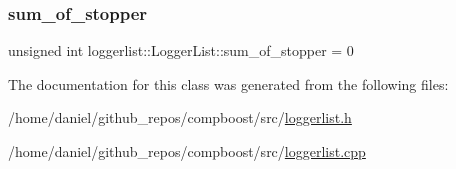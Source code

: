 \subsubsection{\texorpdfstring{sum\+\_\+of\+\_\+stopper}{sum\_of\_stopper}}
{\footnotesize\ttfamily unsigned int loggerlist\+::\+Logger\+List\+::sum\+\_\+of\+\_\+stopper = 0\hspace{0.3cm}{\ttfamily [private]}}



The documentation for this class was generated from the following files\+:\begin{DoxyCompactItemize}
\item 
/home/daniel/github\+\_\+repos/compboost/src/\hyperlink{loggerlist_8h}{loggerlist.\+h}\item 
/home/daniel/github\+\_\+repos/compboost/src/\hyperlink{loggerlist_8cpp}{loggerlist.\+cpp}\end{DoxyCompactItemize}
